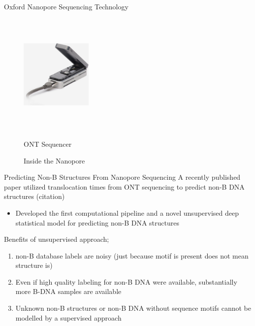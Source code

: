 \documentclass{beamer}
\begin{document}
	\begin{frame}{Oxford Nanopore Sequencing Technology}
		\centering
		\begin{figure}[!htb]
			\centering
			\begin{minipage}{.3\textwidth}
				\centering
				\includegraphics[width=3.5cm, height=6cm]{ont_machine.jpg}
				\caption{ONT Sequencer}
				\label{fig:prob1_6_2}
			\end{minipage}%
			\begin{minipage}{0.7\textwidth}
				\centering
				\caption{Inside the Nanopore}
				\label{fig:prob1_6_1}
			\end{minipage}
		\end{figure}
		
			
	\end{frame}

	\begin{frame}{Predicting Non-B Structures From Nanopore Sequencing}
		A recently published paper utilized translocation times from ONT sequencing to predict non-B DNA structures (citation)
		\begin{itemize}
			\item Developed the first computational pipeline and a novel unsupervised deep statistical model for predicting non-B DNA structures \newline
		\end{itemize}
	
		Benefits  of unsupervised approach;
		\begin{enumerate}
			\item non-B database labels are noisy (just because motif is present does not mean structure is)
			\item Even if high quality labeling for non-B DNA were available, substantially more B-DNA samples are available
			\item Unknown non-B structures or non-B DNA without sequence motifs cannot be modelled by a supervised approach
		\end{enumerate}
	\end{frame}
\end{document}
